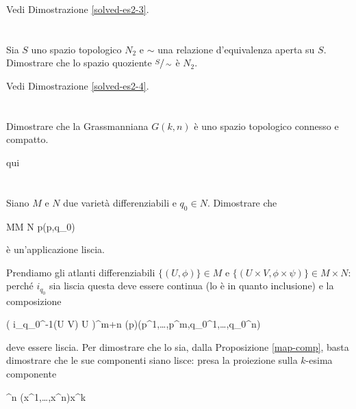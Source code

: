 Vedi Dimostrazione \ref{solved-es2-3}.

\tocless\section{}\label{es2-4}

\begin{tcolorbox}
	Sia $ S $ uno spazio topologico $ N_{2} $ e $ \sim $ una relazione d'equivalenza aperta su $ S $. Dimostrare che lo spazio quoziente $ \sfrac{S}{\sim} $ è $ N_{2} $.
\end{tcolorbox}

Vedi Dimostrazione \ref{solved-es2-4}.

\tocless\section{}\label{es2-5}

\begin{tcolorbox}
	Dimostrare che la Grassmanniana $ G(k,n) $ è uno spazio topologico connesso e compatto.
\end{tcolorbox}

qui

\tocless\section{}\label{es2-6}

\begin{tcolorbox}
	Siano $ M $ e $ N $ due varietà differenziabili e $ q_{0} \in N $. Dimostrare che
	
		{M}{M \times N}%
		{p}{(p,q_{0})}
	
	è un'applicazione liscia.
\end{tcolorbox}

Prendiamo gli atlanti differenziabili $ \{(U,\phi)\} \in M $ e $ \{(U \times V,\phi \times \psi)\} \in M \times N $: perché $ i_{q_{0}} $ sia liscia questa deve essere continua (lo è in quanto inclusione) e la composizione

%
	{\phi( i_{q_{0}}^{-1}(U \times V) \cap U )}{\R^{m+n}}%
	{\phi(p)}{(p^{1},\dots,p^{m},q_{0}^{1},\dots,q_{0}^{n})}

deve essere liscia. Per dimostrare che lo sia, dalla Proposizione \ref{map-comp}, basta dimostrare che le sue componenti siano lisce: presa la proiezione sulla $ k $-esima componente

%
	{\R^{n}}{\R}%
	{(x^{1},\dots,x^{n})}{x^{k}}
	
